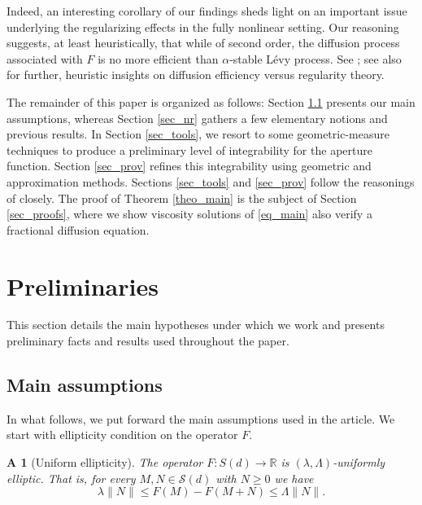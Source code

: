 \documentclass[10pt]{article} %
\newtheorem{Assumption}{A}
\begin{document}
Indeed, an interesting corollary of our findings sheds light on an important issue underlying the regularizing effects in the fully nonlinear setting. Our reasoning suggests, at least heuristically, that while of second order, the diffusion process associated with $F$ is no more efficient than $\alpha$-stable L\'evy process. See \cite{M1}; see also \cite{TeixNotices} for further, heuristic insights on diffusion efficiency versus regularity theory.

The remainder of this paper is organized as follows: Section \ref{sec_assump} presents our main assumptions, whereas Section \ref{sec_nr} gathers a few elementary notions and previous results. In Section \ref{sec_tools}, we resort to some geometric-measure techniques to produce a preliminary level of integrability for the aperture function. Section \ref{sec_prov} refines this integrability using geometric and approximation methods. Sections \ref{sec_tools} and \ref{sec_prov} follow the reasonings of \cite[Chapter 7]{cafcab} closely. The proof of Theorem \ref{theo_main} is the subject of Section \ref{sec_proofs}, where we show viscosity solutions of \eqref{eq_main} also verify a fractional diffusion equation.

\section{Preliminaries}\label{sec_mapm}

This section details the main hypotheses under which we work and presents preliminary facts and results used throughout the paper.

\subsection{Main assumptions}\label{sec_assump}

In what follows, we put forward the main assumptions used in the article. We start with ellipticity condition on the operator $F$.

\begin{Assumption}[Uniform ellipticity]\label{assump_ellip} 
The operator $F \colon S(d) \to \mathbb{R}$ is $(\lambda,\Lambda)$-uniformly elliptic. That is, for every $M, N\in\mathcal{S}(d)$ with $N\geq 0$ we have
\[
	\lambda\|N\|\leq F(M)-F(M+N)\leq\Lambda\|N\|.
\]
\end{Assumption}
\end{document}
